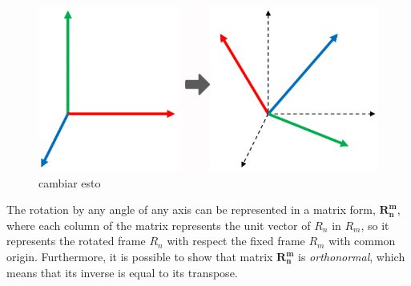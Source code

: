 \begin{figure}
    \centering
    \includegraphics[width=\textwidth]{Images/fig17-3D-rotation-example}
    \caption[Rotation around origin]{cambiar esto}
    \label{fig:chapter1:transformation:rotation:3d-example}
\end{figure}

The rotation by any angle of any axis can be represented in a matrix form, $\bm{R_n^m}$, where each column of the matrix represents the unit vector of $R_n$ in $R_m$, so it represents the rotated frame $R_n$ with respect the fixed frame $R_m$ with common origin. Furthermore, it is possible to show that matrix $\bm{R_n^m}$ is \emph{orthonormal}, which means that its inverse is equal to its transpose.\\

